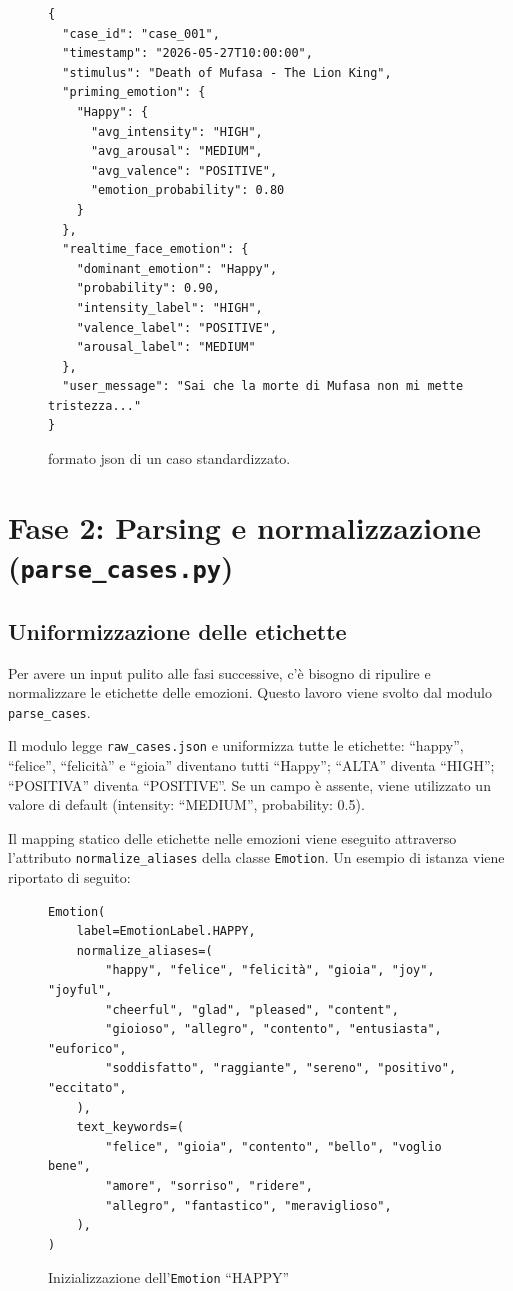 \documentclass[11pt]{report}
\begin{document}
\begin{figure}[H]
\begin{verbatim}
{
  "case_id": "case_001",
  "timestamp": "2026-05-27T10:00:00",
  "stimulus": "Death of Mufasa - The Lion King",
  "priming_emotion": {
    "Happy": {
      "avg_intensity": "HIGH",
      "avg_arousal": "MEDIUM",
      "avg_valence": "POSITIVE",
      "emotion_probability": 0.80
    }
  },
  "realtime_face_emotion": {
    "dominant_emotion": "Happy",
    "probability": 0.90,
    "intensity_label": "HIGH",
    "valence_label": "POSITIVE",
    "arousal_label": "MEDIUM"
  },
  "user_message": "Sai che la morte di Mufasa non mi mette tristezza..."
}
\end{verbatim}
\caption{formato json di un caso standardizzato.}
\end{figure}
 
 
\section{Fase 2: Parsing e normalizzazione (\texttt{parse\_cases.py})}
 
\subsection{Uniformizzazione delle etichette}
Per avere un input pulito alle fasi successive, c'è bisogno di ripulire e normalizzare le etichette delle emozioni. Questo lavoro viene svolto dal modulo \texttt{parse\_cases}.
 
Il modulo legge \texttt{raw\_cases.json} e uniformizza tutte le etichette: ``happy'', ``felice'', ``felicità'' e ``gioia'' diventano tutti ``Happy''; ``ALTA'' diventa ``HIGH''; ``POSITIVA'' diventa ``POSITIVE''. Se un campo è assente, viene utilizzato un valore di default (intensity: ``MEDIUM'', probability: 0.5).
 
Il mapping statico delle etichette nelle emozioni viene eseguito attraverso l'attributo \texttt{normalize\_aliases} della classe \texttt{Emotion}. Un esempio di istanza viene riportato di seguito:

\begin{figure}[H]
\begin{verbatim}
Emotion(
    label=EmotionLabel.HAPPY,
    normalize_aliases=(
        "happy", "felice", "felicità", "gioia", "joy", "joyful",
        "cheerful", "glad", "pleased", "content",
        "gioioso", "allegro", "contento", "entusiasta", "euforico", 
        "soddisfatto", "raggiante", "sereno", "positivo", "eccitato",
    ),
    text_keywords=(
        "felice", "gioia", "contento", "bello", "voglio bene",
        "amore", "sorriso", "ridere", 
        "allegro", "fantastico", "meraviglioso",
    ),
)
\end{verbatim}
\caption{Inizializzazione dell'\texttt{Emotion} ``HAPPY''}
\end{figure}
 
\end{document}
